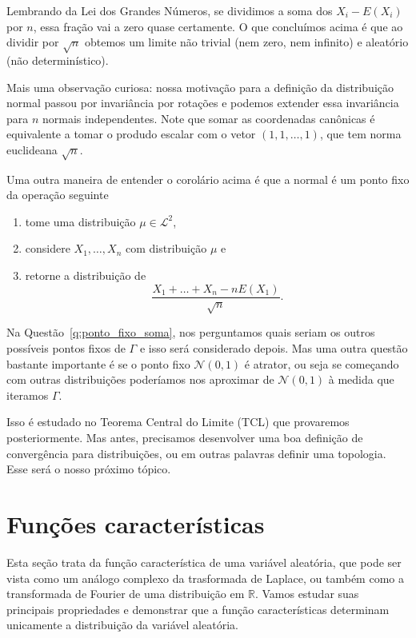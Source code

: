 Lembrando da Lei dos Grandes Números, se dividimos a soma dos $X_i - E(X_i)$ por $n$, essa fração vai a zero quase certamente.
O que concluímos acima é que ao dividir por $\sqrt{n}$ obtemos um limite não trivial (nem zero, nem infinito) e aleatório (não determinístico).

Mais uma observação curiosa: nossa motivação para a definição da distribuição normal passou por invariância por rotações e podemos extender essa invariância para $n$ normais independentes.
Note que somar as coordenadas canônicas é equivalente a tomar o produdo escalar com o vetor $(1,1,\dots,1)$, que tem norma euclideana $\sqrt{n}$.

Uma outra maneira de entender o corolário acima é que a normal é um ponto fixo da operação seguinte
\begin{enumerate}[\quad a)]
\item tome uma distribuição $\mu \in \mathcal{L}^2$,
\item considere $X_1, \dots, X_n$ \iid com distribuição $\mu$ e
\item retorne a distribuição de
  \begin{equation}
    \frac{X_1 + \dots + X_n - n E(X_1)}{\sqrt{n}}.
  \end{equation}
\end{enumerate}

Na Questão~\ref{q:ponto_fixo_soma}, nos perguntamos quais seriam os outros possíveis pontos fixos de $\Gamma$ e isso será considerado depois.
Mas uma outra questão bastante importante é se o ponto fixo $\mathcal{N}(0,1)$ é atrator, ou seja se começando com outras distribuições poderíamos nos aproximar de $\mathcal{N}(0,1)$ à medida que iteramos $\Gamma$.

Isso é estudado no Teorema Central do Limite (TCL) que provaremos posteriormente.
Mas antes, precisamos desenvolver uma boa definição de convergência para distribuições, ou em outras palavras definir uma topologia.
Esse será o nosso próximo tópico.



\section{Funções características}

Esta seção trata da função característica de uma variável aleatória, que pode ser vista como um análogo complexo da trasformada de Laplace, ou também como a transformada de Fourier de uma distribuição em $\mathbb{R}$.
   Vamos estudar suas principais propriedades e demonstrar que a função características determinam unicamente a distribuição da variável aleatória.
 
